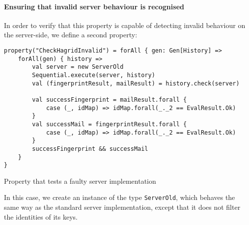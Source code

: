 \paragraph{Ensuring that invalid server behaviour is recognised}
In order to verify that this property is capable of detecting invalid behaviour on the server-side, we define a second property:
\begin{code}
    \begin{verbatim}
property("CheckHagridInvalid") = forAll { gen: Gen[History] =>
    forAll(gen) { history =>
        val server = new ServerOld
        Sequential.execute(server, history)
        val (fingerprintResult, mailResult) = history.check(server)

        val successFingerprint = mailResult.forall {
            case (_, idMap) => idMap.forall(_._2 == EvalResult.Ok)
        }
        val successMail = fingerprintResult.forall {
            case (_, idMap) => idMap.forall(_._2 == EvalResult.Ok)
        }
        successFingerprint && successMail
    }
}
    \end{verbatim}
    \caption{Property that tests a faulty server implementation}
\end{code}  

In this case, we create an instance of the type \texttt{ServerOld}, which behaves the same way as the standard server implementation, except that it does not filter the identities of its keys. 

